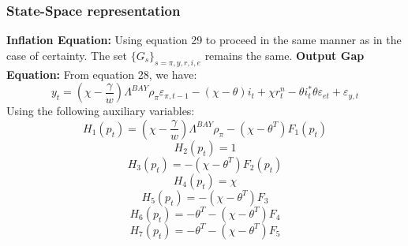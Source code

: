 \documentclass{beamer}
\begin{document}
\begin{frame}
\frametitle{State-Space representation}
\textbf{Inflation Equation: }Using equation 29 to proceed in the same manner as
in the case of certainty. The set $\{G_s\}_{s=\pi,y,r,i,e}$ remains the same.
\newline
\newline
\textbf{Output Gap Equation: }From equation 28, we have:
\begin{equation}
y_t = \left ( \chi - \frac{\gamma}{w} \right ) \Lambda^{BAY} \rho_\pi \varepsilon_{\pi,t-1} - (\chi-\theta) i_t + \chi r_t^n - \theta i_t^* \theta \varepsilon_{et} + \varepsilon_{y,t}
\end{equation}
Using the following auxiliary variables:
\small
\begin{equation}
H_1 (p_t) = \left ( \chi - \frac{\gamma}{w} \right ) \Lambda^{BAY} \rho_\pi - (\chi-\theta^T) F_1 (p_t)
\end{equation}
\begin{equation}
H_2 (p_t) = 1
\end{equation}
\begin{equation}
H_3 (p_t) = - (\chi-\theta^T) F_2 (p_t)
\end{equation}
\begin{equation}
H_4 (p_t) = \chi
\end{equation}
\begin{equation}
H_5 (p_t) = - (\chi - \theta^T) F_3
\end{equation}
\begin{equation}
H_6 (p_t) = -\theta^T - (\chi - \theta^T) F_4
\end{equation}
\begin{equation}
H_7 (p_t) = -\theta^T - (\chi - \theta^T) F_5
\end{equation}
\end{frame}
\end{document}
